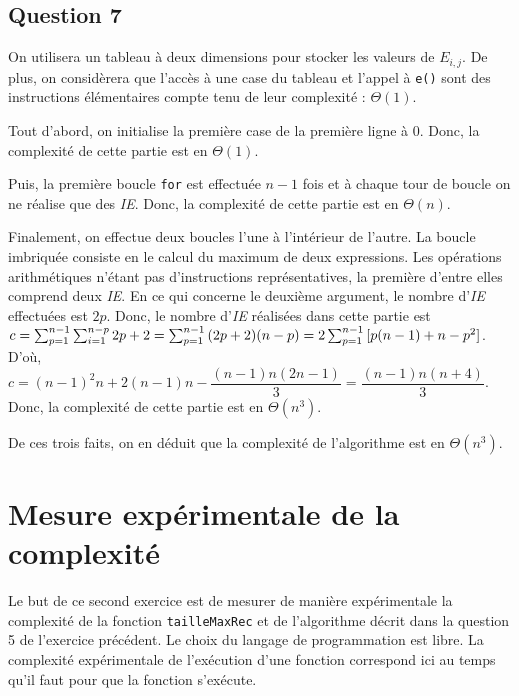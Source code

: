 \documentclass[12pt,a4paper]{article}
\begin{document}
\subsection{Question 7}
On utilisera un tableau \`a deux dimensions pour stocker les valeurs de \( E_{i,j} \). De plus, on consid\`erera que l'acc\`es \`a une case du tableau et l'appel \`a \texttt{e()} sont des instructions \'el\'ementaires  compte tenu de leur complexit\'e : $\Theta(1)$. 

Tout d'abord, on initialise la premi\`ere case de la premi\`ere ligne \`a 0. Donc, la complexit\'e de cette partie est en $\Theta(1)$. 

Puis, la premi\`ere boucle \texttt{for} est effectu\'ee \( n-1 \) fois et \`a chaque tour de boucle on ne r\'ealise que des {\itshape IE}. Donc, la complexit\'e de cette partie est en $\Theta(n)$. 

Finalement, on effectue deux boucles l'une \`a l'int\'erieur de l'autre. La boucle imbriqu\'ee consiste en le calcul du maximum de deux expressions. Les op\'erations arithm\'etiques n'\'etant pas d'instructions repr\'esentatives, la premi\`ere d'entre elles comprend deux {\itshape IE}. En ce qui concerne le deuxi\`eme argument, le nombre d'{\itshape IE} effectu\'ees est \( 2p \). Donc, le nombre d'{\itshape IE} r\'ealis\'ees dans cette partie est \( \\c = \sum_{p=1}^{n-1}\sum_{i=1}^{n-p}{2p+2} = \sum_{p=1}^{n-1}{(2p+2)(n-p)} = 2\sum_{p=1}^{n-1}{[p(n-1)+n-p^2]} \). D'o\`u, \( c = (n-1)^2n + 2(n-1)n - \dfrac{(n-1)n(2n-1)}{3} = \dfrac{(n-1)n(n+4)}{3} \). Donc, la complexit\'e de cette partie est en $\Theta(n^3)$.

De ces trois faits, on en d\'eduit que la complexit\'e de l'algorithme est en $\Theta(n^3)$.

\lstset{language=Python,inputencoding=utf8/latin1}

\lstset{escapechar=@,style=custompy}
\newpage
\section{Mesure exp\'erimentale de la complexit\'e}
Le but de ce second exercice est de mesurer de mani\`ere exp\'erimentale la complexit\'e de la fonction \texttt{tailleMaxRec} et de l'algorithme d\'ecrit dans la question 5 de l'exercice pr\'ec\'edent. Le choix du langage de programmation est libre. La complexit\'e exp\'erimentale de l'ex\'ecution d'une fonction correspond ici au temps qu'il faut pour que la fonction s'ex\'ecute.
\end{document}
